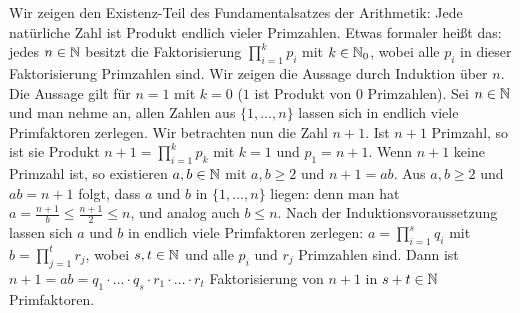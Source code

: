 \begin{bsp}
	Wir zeigen den Existenz-Teil des Fundamentalsatzes der Arithmetik: Jede natürliche Zahl ist Produkt endlich vieler Primzahlen.  Etwas formaler heißt das: jedes $n \in \mathbb N$ besitzt die Faktorisierung $\prod_{i=1}^k p_i$ mit $k \in \mathbb N_0$, wobei alle $p_i$ in dieser Faktorisierung Primzahlen sind. Wir zeigen die Aussage durch Induktion über $n$. Die Aussage gilt für $n=1$ mit $k=0$ ($1$ ist Produkt von $0$ Primzahlen). Sei $n \in \mathbb N$ und man nehme an, allen Zahlen aus $\{1,\ldots,n\}$ lassen sich in endlich viele Primfaktoren zerlegen. Wir betrachten nun die Zahl $n+1$. Ist $n+1$ Primzahl, so ist sie Produkt $n+ 1 = \prod_{i=1}^k p_k$ mit $k=1$ und $p_1=n+1$. Wenn $n+1$ keine Primzahl ist, so existieren $a, b \in \mathbb N$ mit $a, b \ge 2$ und $n+1 = ab$. Aus $a,b \ge 2$ und $ab = n+1$ folgt, dass $a$ und $b$ in $\{1,\ldots,n\}$ liegen: denn man hat $a = \frac{n+1}{b} \le \frac{n+1}{2} \le n$, und analog auch $b \le n$. Nach der Induktionsvoraussetzung lassen sich $a$ und $b$ in endlich viele Primfaktoren zerlegen: $a = \prod_{i=1}^s q_i$ mit $b = \prod_{j=1}^t r_j$, wobei $s, t\in \mathbb N$ und alle $p_i$ und $r_j$ Primzahlen sind. Dann ist $n+1 = ab = q_1 \cdot \ldots \cdot q_s \cdot r_1 \cdot \ldots \cdot r_t$ Faktorisierung von $n+1$ in $s+t \in \mathbb N$ Primfaktoren. 
\end{bsp} 



